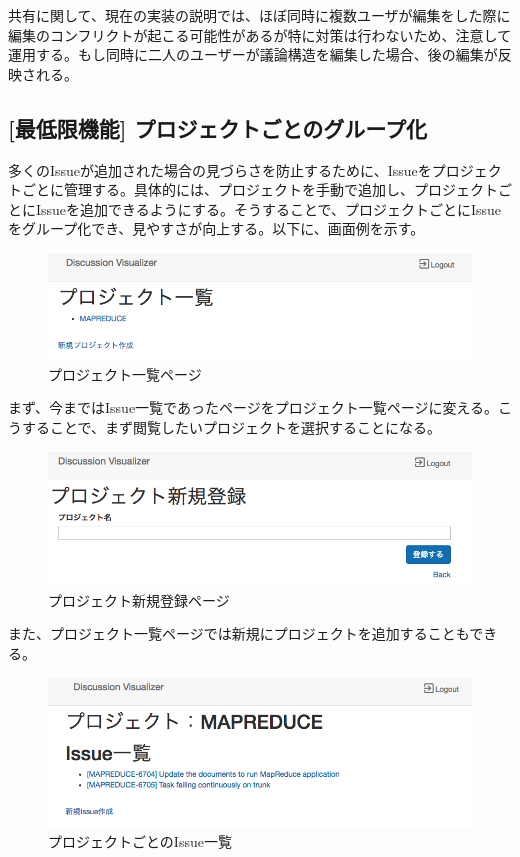 \documentclass[12pt, oneside]{jreport}
\begin{document}
		共有に関して、現在の実装の説明では、ほぼ同時に複数ユーザが編集をした際に編集のコンフリクトが起こる可能性があるが特に対策は行わないため、注意して運用する。もし同時に二人のユーザーが議論構造を編集した場合、後の編集が反映される。
		
		\subsection{[最低限機能] プロジェクトごとのグループ化}
		多くのIssueが追加された場合の見づらさを防止するために、Issueをプロジェクトごとに管理する。具体的には、プロジェクトを手動で追加し、プロジェクトごとにIssueを追加できるようにする。そうすることで、プロジェクトごとにIssueをグループ化でき、見やすさが向上する。以下に、画面例を示す。
		
		\begin{figure}[H]
		\centering
		\includegraphics[width=17cm,bb=700 300 -200 27]{ProjectList.png}
		\caption{プロジェクト一覧ページ}
		\end{figure}
		
		まず、今まではIssue一覧であったページをプロジェクト一覧ページに変える。こうすることで、まず閲覧したいプロジェクトを選択することになる。
			
		\begin{figure}[H]
		\centering
		\includegraphics[width=17cm,bb=500 300 -200 27]{ProjectAdd.png}
		\caption{プロジェクト新規登録ページ}
		\end{figure}
		
		また、プロジェクト一覧ページでは新規にプロジェクトを追加することもできる。
		
		\begin{figure}[H]
		\centering
		\includegraphics[width=17cm,bb=500 300 -200 27]{ProjectIssueList.png}
		\caption{プロジェクトごとのIssue一覧}
		\end{figure}
		
\end{document}
